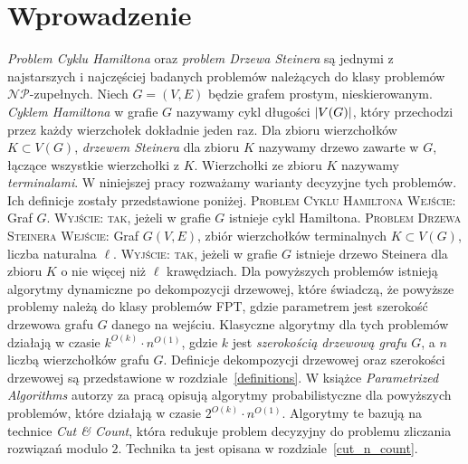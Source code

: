 \documentclass[12pt, oneside]{report}
\newcommand\Omicron{O}
\begin{document}
  	\chapter{Wprowadzenie}
	\emph{Problem Cyklu Hamiltona} oraz \emph{problem Drzewa Steinera} są jednymi z najstarszych i najczęściej badanych problemów należących do klasy problemów $\mathcal{NP}$-zupełnych. Niech $G=(V, E)$ będzie grafem prostym, nieskierowanym. \emph{Cyklem Hamiltona} w grafie $G$ nazywamy cykl długości $\abs{V(G)}$, który przechodzi przez każdy wierzchołek dokładnie jeden raz. Dla zbioru wierzchołków $K \subset V(G)$, \emph{drzewem Steinera} dla zbioru $K$ nazywamy drzewo zawarte w $G$, łączące wszystkie wierzchołki z $K$. Wierzchołki ze zbioru $K$ nazywamy \emph{terminalami}.  
	W niniejszej pracy rozważamy warianty decyzyjne tych problemów. Ich definicje zostały przedstawione poniżej. 
\newline\newline
\textsc{Problem Cyklu Hamiltona}
\newline
\textsc{ Wejście:} Graf $G$.
\newline
\textsc{ Wyjście:} \textsc{tak}, jeżeli w grafie $G$ istnieje cykl Hamiltona.
\newline\newline
\textsc{Problem Drzewa Steinera}
\newline
\textsc{ Wejście:} Graf $G(V,E)$, zbiór wierzchołków terminalnych $K \subset V(G)$, liczba naturalna $\ell$.
\newline
\textsc{ Wyjście:} \textsc{tak}, jeżeli w grafie $G$ istnieje drzewo Steinera dla zbioru $K$ o nie więcej niż $\ell$ krawędziach.
\newline\newline
Dla powyższych problemów istnieją algorytmy dynamiczne po dekompozycji drzewowej, które świadczą, że powyższe problemy należą do klasy problemów FPT, gdzie parametrem jest szerokość drzewowa grafu $G$ danego na wejściu. Klasyczne algorytmy dla tych problemów działają w czasie $k^{\Omicron(k)} \cdot n^{\Omicron{(1)}}$, gdzie $k$ jest \emph{szerokością drzewową grafu $G$}, a $n$ liczbą wierzchołków grafu $G$. Definicje dekompozycji drzewowej oraz szerokości drzewowej są przedstawione w rozdziale~\ref{definitions}. W książce \emph{Parametrized Algorithms} \cite{parametrized_algorithms} autorzy za pracą \cite{solving_connectivity_problems} opisują algorytmy probabilistyczne dla powyższych problemów, które działają w czasie $2^{\Omicron(k)} \cdot n^{\Omicron{(1)}}$. Algorytmy te bazują na technice \emph{Cut \& Count}, która redukuje problem decyzyjny do problemu zliczania rozwiązań modulo $2$. Technika ta jest opisana w rozdziale~\ref{cut_n_count}.
\end{document}
